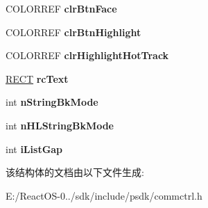 \begin{DoxyCompactItemize}
\mbox{\label{struct___n_m_t_b_c_u_s_t_o_m_d_r_a_w_a4d11d3a95e50d8dc1a8b3bcc947a472d}} 
C\+O\+L\+O\+R\+R\+EF {\bfseries clr\+Btn\+Face}
\item 
\mbox{\label{struct___n_m_t_b_c_u_s_t_o_m_d_r_a_w_ad81793c7d478878c251cb43b4e75822a}} 
C\+O\+L\+O\+R\+R\+EF {\bfseries clr\+Btn\+Highlight}
\item 
\mbox{\label{struct___n_m_t_b_c_u_s_t_o_m_d_r_a_w_af9b246227ef300a77f0ce5967c145960}} 
C\+O\+L\+O\+R\+R\+EF {\bfseries clr\+Highlight\+Hot\+Track}
\item 
\mbox{\label{struct___n_m_t_b_c_u_s_t_o_m_d_r_a_w_a5c62e3f4837aa596542387c33402bca7}} 
\hyperlink{structtag_r_e_c_t}{R\+E\+CT} {\bfseries rc\+Text}
\item 
\mbox{\label{struct___n_m_t_b_c_u_s_t_o_m_d_r_a_w_a84652e1516a3dc8a5f7ac8c92fcbfcc2}} 
int {\bfseries n\+String\+Bk\+Mode}
\item 
\mbox{\label{struct___n_m_t_b_c_u_s_t_o_m_d_r_a_w_a42eb5228f8b455ed59cb245fa6dae602}} 
int {\bfseries n\+H\+L\+String\+Bk\+Mode}
\item 
\mbox{\label{struct___n_m_t_b_c_u_s_t_o_m_d_r_a_w_aac14a176a2a2cdbc7c40af0e62dbc3ea}} 
int {\bfseries i\+List\+Gap}
\end{DoxyCompactItemize}


该结构体的文档由以下文件生成\+:\begin{DoxyCompactItemize}
\item 
E\+:/\+React\+O\+S-\/0../sdk/include/psdk/commctrl.\+h\end{DoxyCompactItemize}
